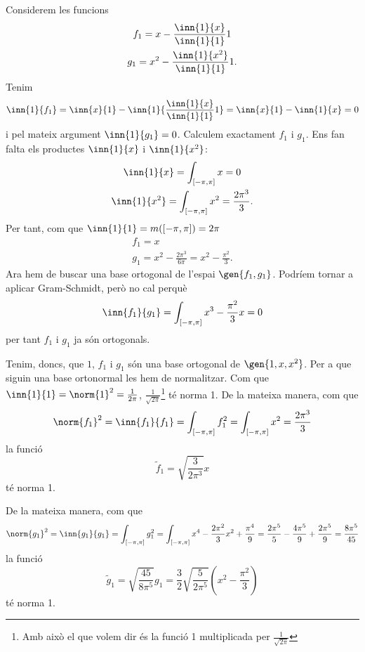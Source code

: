 \documentclass[12pt]{article}
\begin{document}
Considerem les funcions
\begin{gather*}
	f_1 = x - \frac{\inn{1}{x}}{\inn{1}{1}}1 \\
	g_1 = x^2 - \frac{\inn{1}{x^2}}{\inn{1}{1}}1.
\end{gather*}
Tenim
\begin{equation*}
	\inn{1}{f_1} = \inn{x}{1} - \inn{1}{\frac{\inn{1}{x}}{\inn{1}{1}}1} = \inn{x}{1} -
	\inn{1}{x} = 0
\end{equation*}
i pel mateix argument \( \inn{1}{g_1} = 0 \). Calculem exactament \( f_1 \) i \( g_1 \).
Ens fan falta els productes \( \inn{1}{x} \) i \( \inn{1}{x^2} \):
\begin{gather*}
	\inn{1}{x} = \int_{[-\pi, \pi]} x = 0 \\
	\inn{1}{x^2} = \int_{[-\pi, \pi]} x^2 = \frac{2\pi^3}{3}.
\end{gather*}
Per tant, com que \( \inn{1}{1} = m([-\pi,\pi]) = 2\pi \)
\begin{gather*}
	f_1 = x \\
	g_1 = x^2 - \frac{2\pi^3}{6\pi} = x^2 - \frac{\pi^2}{3}.
\end{gather*}
Ara hem de buscar una base ortogonal de l'espai \( \gen{f_1, g_1} \). Podríem tornar a
aplicar Gram-Schmidt, però no cal perquè
\begin{equation*}
	\inn{f_1}{g_1} = \int_{[-\pi,\pi]} x^3 - \frac{\pi^2}{3}x = 0
\end{equation*}
per tant \( f_1 \) i \( g_1 \) ja són ortogonals.

Tenim, doncs, que \( 1 \), \( f_1 \) i \( g_1 \) són una base ortogonal de \(
\gen{1,x,x^2} \). Per a que siguin una base ortonormal les hem de normalitzar. Com que \(
\inn{1}{1} = \norm{1}^2 = \frac{1}{2\pi} \), \( \frac{1}{\sqrt{2\pi}} \)\footnote{Amb això
el que volem dir és la funció 1 multiplicada per \( \frac{1}{\sqrt{2\pi}} \)} té norma 1.
De la mateixa manera, com que
\begin{equation*}
	\norm{f_1}^2 = \inn{f_1}{f_1} = \int_{[-\pi,\pi]} f_1^2 = \int_{[-\pi, \pi]} x^2 =
	\frac{2\pi^3}{3}
\end{equation*}
la funció
\begin{equation*}
	\tilde{f}_1 = \sqrt{\frac{3}{2\pi^3}} x
\end{equation*}
té norma 1.

De la mateixa manera, com que
\begin{equation*}
	\norm{g_1}^2 = \inn{g_1}{g_1} = \int_{[-\pi, \pi]} g_1^2 = \int_{[-\pi,\pi]} x^4 -
	\frac{2\pi^2}{3}x^2 + \frac{\pi^4}{9} = \frac{2\pi^5}{5} -
	\frac{4\pi^5}{9} + \frac{2\pi^5}{9} = \frac{8\pi^5}{45}
\end{equation*}
la funció
\begin{equation*}
	\tilde{g}_1 = \sqrt{\frac{45}{8\pi^5}} g_1 = \frac{3}{2}\sqrt{\frac{5}{2\pi^5}}\left(x^2 -
	\frac{\pi^2}{3}\right) 
\end{equation*}
té norma 1.
\end{document}
